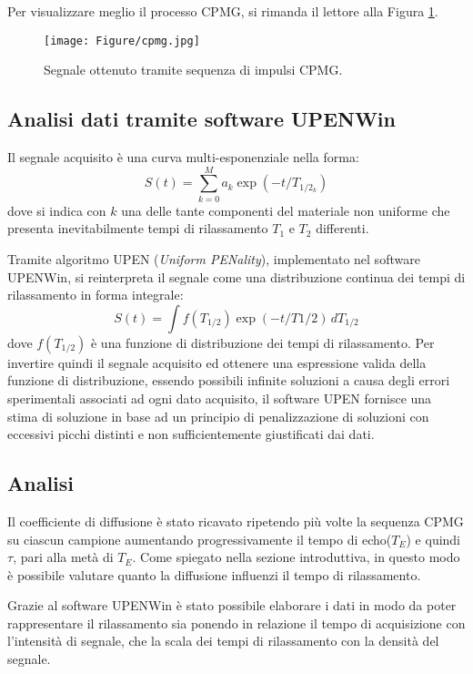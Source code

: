 Per visualizzare meglio il processo CPMG, si rimanda il lettore alla Figura \ref{fig:cpmg}.

\begin{figure}[ht]
\centering
\texttt{[image: Figure/cpmg.jpg]}
\caption{Segnale ottenuto tramite sequenza di impulsi CPMG.}
\label{fig:cpmg}
\end{figure}


\subsection*{Analisi dati tramite software UPENWin}

Il segnale acquisito è una curva multi-esponenziale nella forma:
\begin{equation}
	S(t) = \sum_{k=0}^M a_k \exp(-t/T_{1/2_k})
\end{equation}
dove si indica con $k$ una delle tante componenti del materiale non uniforme che presenta inevitabilmente tempi di rilassamento $T_1$ e $T_2$ differenti.

Tramite algoritmo UPEN (\textit{Uniform PENality}), implementato nel software UPENWin, si reinterpreta il segnale come una distribuzione continua dei tempi di rilassamento in forma integrale:
\begin{equation}
	S(t) = \int f(T_{1/2}) \exp(-t/T{1/2}) \, dT_{1/2}
\end{equation}
dove $f(T_{1/2})$ è una funzione di distribuzione dei tempi di rilassamento. Per invertire quindi il segnale acquisito ed ottenere una espressione valida della funzione di distribuzione, essendo possibili infinite soluzioni a causa degli errori sperimentali associati ad ogni dato acquisito, il software UPEN fornisce una stima di soluzione in base ad un principio di penalizzazione di soluzioni con eccessivi picchi distinti e non sufficientemente giustificati dai dati.

\subsection*{Analisi}

Il coefficiente di diffusione è stato ricavato ripetendo più volte la sequenza CPMG su ciascun campione aumentando progressivamente il tempo di echo($T_E$) e quindi $\tau$, pari alla metà di $T_E$.
Come spiegato nella sezione introduttiva, in questo modo è possibile  valutare quanto la diffusione influenzi il tempo di rilassamento.

Grazie al software UPENWin è stato possibile elaborare i dati in modo da poter rappresentare il rilassamento sia ponendo in relazione il tempo di acquisizione con l'intensità di segnale, che la scala dei tempi di rilassamento con la densità del segnale.

